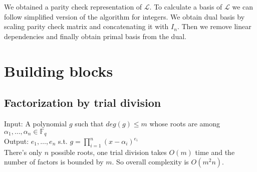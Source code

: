 \documentclass[12pt]{article}
\newcommand{\LL}{\mathcal{L}}
\begin{document}
We obtained a parity check representation of $\LL$.
To calculate a basis of $\LL$ we can follow simplified version of the algorithm for integers. We obtain dual basis by scaling parity check matrix and concatenating it with $I_{n}$. Then we remove linear dependencies and finally obtain primal basis from the dual.

\section{Building blocks}
\subsection{Factorization by trial division}
Input: A polynomial $g$ such that $deg(g) \leq m$ whose roots are among $\alpha_1, \dots , \alpha_n \in \mathbb{F}_q$\\
Output: $e_1, \dots , e_n$ s.t. $g = \prod_{i = 1}^{n}(x - \alpha_i)^{e_i}$\\
There's only $n$ possible roots, one trial division takes $O(m)$ time and the number of factors is bounded by $m$. So overall complexity is $O(m^2n)$.
\end{document}
